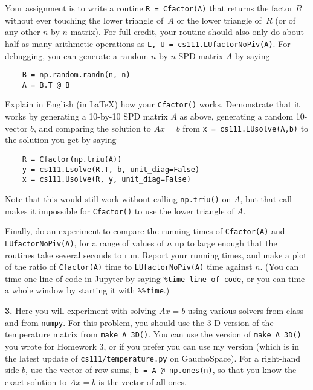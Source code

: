 \documentclass[11pt]{article}
\begin{document}
Your assignment is to write a routine {\tt R = Cfactor(A)} that returns the 
factor $R$ without ever touching the lower triangle of~$A$ or the lower
triangle of~$R$ (or of any other $n$-by-$n$ matrix).
For full credit, your routine should also only do about half as many
arithmetic operations as {\tt L, U = cs111.LUfactorNoPiv(A)}.
For debugging, you can generate a random $n$-by-$n$ SPD matrix $A$ by saying
\begin{verbatim}
    B = np.random.randn(n, n)
    A = B.T @ B
\end{verbatim}
Explain in English (in LaTeX) how your {\tt Cfactor()} works.
Demonstrate that it works by generating a 10-by-10 SPD matrix $A$ as above,
generating a random 10-vector $b$, and comparing the solution to $Ax=b$
from {\tt x = cs111.LUsolve(A,b)} to the solution you get by saying
\begin{verbatim}
    R = Cfactor(np.triu(A))
    y = cs111.Lsolve(R.T, b, unit_diag=False)
    x = cs111.Usolve(R, y, unit_diag=False)
\end{verbatim}
Note that this would still work without calling {\tt np.triu()} on $A$, 
but that call makes it impossible for {\tt Cfactor()} to use the lower triangle of $A$.

Finally, do an experiment to compare the running times of {\tt Cfactor(A)}
and {\tt LUfactorNoPiv(A)}, for a range of values of $n$ up to large
enough that the routines take several seconds to run. Report your running times,
and make a plot of the ratio of 
{\tt Cfactor(A)} time to {\tt LUfactorNoPiv(A)} time against $n$.
(You can time one line of code in Jupyter by saying {\tt \%time line-of-code}, 
or you can time a whole window by starting it with {\tt \%\%time}.)

\par\bigskip
{\bf 3.} 
Here you will experiment with solving $Ax=b$ using various solvers
from class and from {\tt numpy}.
For this problem, you should use the 3-D version of the temperature matrix
from {\tt make\_A\_3D()}.
You can use the version of {\tt make\_A\_3D()}
you wrote for Homework 3, or if you prefer you can use 
my version (which is in the latest update of {\tt cs111/temperature.py} on GauchoSpace).
For a right-hand side $b$, use the vector of row sums, {\tt b = A @ np.ones(n)},
so that you know the exact solution to $Ax=b$ is the vector of all ones.
\end{document}
